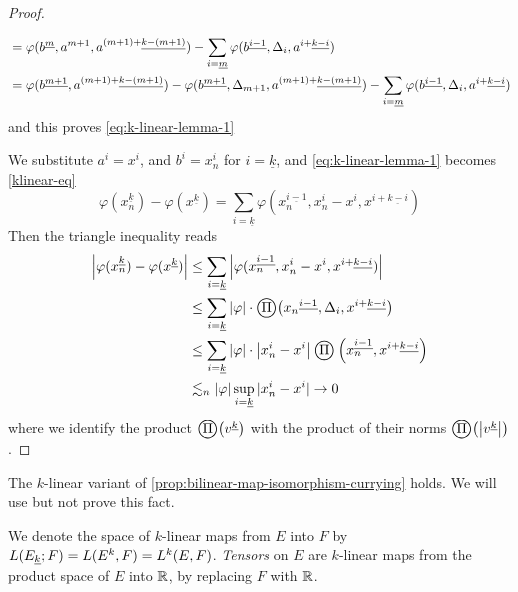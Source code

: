 \documentclass[../main-manifolds.tex]{subfiles}
\begin{document}
\begin{proof}
\begin{note}
\begin{align*}
            &= \varphi(\UPL{b}[m],a^{m+1},\UPL{a}[(m+1)+][k-(m+1)]) - \sum_{i=\underline{m}}\varphi(\UPL{b}[i-1],\Delta_i,\UPL{a}[i+][k-i])\\
            &= \varphi(\UPL{b}[m+1],\UPL{a}[(m+1)+][k-(m+1)]) - \varphi(\UPL{b}[m+1],\Delta_{m+1},\UPL{a}[(m+1)+][k-(m+1)]) - \sum_{i=\underline{m}}\varphi(\UPL{b}[i-1],\Delta_i,\UPL{a}[i+][k-i])
        \end{align*}
        and this proves \cref{eq:k-linear-lemma-1}
    \end{note}
    We substitute $a^i = x^i$, and $b^i = x_n^i$ for $i = \underline{k}$, and \cref{eq:k-linear-lemma-1} becomes \cref{klinear-eq}
    \begin{equation}\label{klinear-eq}
        \varphi(x_n^{\underline{k}}) - \varphi(x^{\underline{k}}) = \sum_{i=\underline{k}}\varphi(x_n^{\underline{i-1}}, x_n^i - x^i, x^{i+\underline{k-i}})
    \end{equation}
    Then the triangle inequality reads
    \begin{align*}
        \abs{\varphi(x_n^{\underline{k}}) - \varphi(x^{\underline{k}})} &\leq \sum_{i=\underline{k}} \abs{\varphi(x_n^{\underline{i-1}}, x_n^i - x^i, x^{i+\underline{k-i}})}\\
        &\leq \sum_{i=\underline{k}}\abs{\varphi}\cdot\bigoprod\qty({\UPL{x_n}[i-1],\Delta_i,\UPL{x}[i+][k-i]})\\
        &\leq \sum_{i=\underline{k}}\abs{\varphi}\cdot\abs{x_n^i - x^i}\bigoprod\qty(x_n^{\underline{i-1}}, x^{i+\underline{k-i}})\\
        &\Lsim_n\vert\varphi\vert\sup_{i=\underline{k}}\vert x_n^i - x^i\vert\to 0
    \end{align*}
    where we identify the product $\bigoprod\qty(\UPL{v}[k])$ with the product of their norms $\bigoprod \qty(\abs{\UPL{v}[k]})$. 
\end{proof}
\begin{remark}
    The $k$-linear variant of \cref{prop:bilinear-map-isomorphism-currying} holds. We will use but not prove this fact.
\end{remark}
\begin{remark}
We denote the space of $k$-linear maps from $E$ into $F$ by $L(\UL{E}[k]; F) = L(E^k, F) = L^k(E,F)$. \emph{Tensors} on $E$ are $k$-linear maps from the product space of $E$ into $\mathbb{R}$, by replacing $F$ with $\mathbb{R}$.
\end{remark}
%
%
\end{document}
